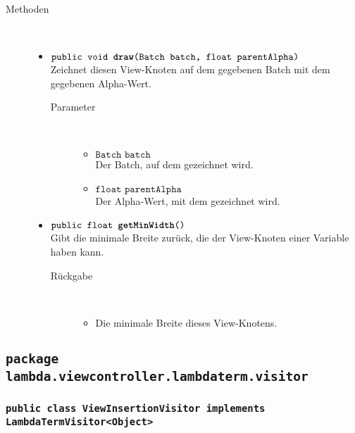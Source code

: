 \begin{description}
\item[Methoden] \hfill \\
	\vspace{-.8cm}
	\begin{itemize}
		\item $\texttt{public void \textbf{draw}(Batch batch, float parentAlpha)}$ \\ Zeichnet diesen View-Knoten auf dem gegebenen Batch mit dem gegebenen Alpha-Wert. %
		\begin{description}
			\item[Parameter] \hfill \\
			\vspace{-.8cm}
			\begin{itemize}
				\item $\texttt{Batch batch}$ \\ Der Batch, auf dem gezeichnet wird.
				\item $\texttt{float parentAlpha}$ \\ Der Alpha-Wert, mit dem gezeichnet wird.
			\end{itemize}
		\end{description}
			
		\item $\texttt{public float \textbf{getMinWidth}()}$ \\ Gibt die minimale Breite zurück, die der View-Knoten einer Variable haben kann.
		\begin{description}
			\item[Rückgabe] \hfill \\
			\vspace{-.8cm}
			\begin{itemize}
				\item Die minimale Breite dieses View-Knotens.
			\end{itemize}
		\end{description}
	\end{itemize}
\end{description}
\subsection{\texttt{package lambda.viewcontroller.lambdaterm.visitor}}

\subsubsection{\normalfont \texttt{public class \textbf{ViewInsertionVisitor} implements LambdaTermVisitor<Object>}}

